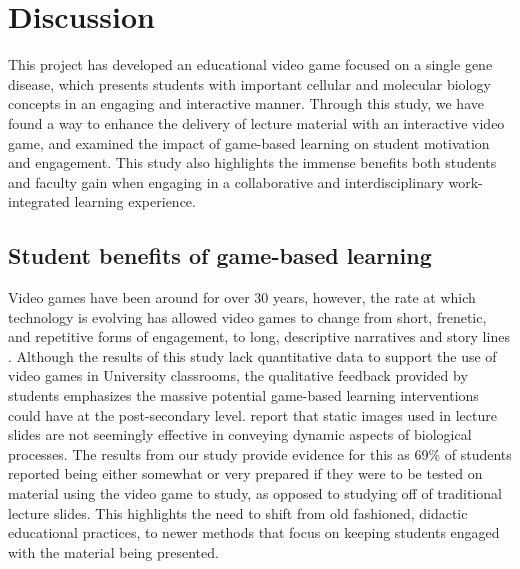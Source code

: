 \documentclass[10pt]{article}
\begin{document}
\newpage

\section{Discussion}

This project has developed an educational video game focused on a single gene disease, which presents students with important cellular and molecular biology concepts in an engaging and interactive manner. Through this study, we have found a way to enhance the delivery of lecture material with an interactive video game, and examined the impact of game-based learning on student motivation and engagement. This study also highlights the immense benefits both students and faculty gain when engaging in a collaborative and interdisciplinary work-integrated learning experience. 

\subsection{Student benefits of game-based learning}

Video games have been around for over 30 years, however, the rate at which technology is evolving has allowed video games to change from short, frenetic, and repetitive forms of engagement, to long, descriptive narratives and story lines \citep{annetta2008video}. Although the results of this study lack quantitative data to support the use of video games in University classrooms, the qualitative feedback provided by students emphasizes the massive potential game-based learning interventions could have at the post-secondary level. \citet{o2009garage} report that static images used in lecture slides are not seemingly effective in conveying dynamic aspects of biological processes. The results from our study provide evidence for this as 69\% of students reported being either somewhat or very prepared if they were to be tested on material using the video game to study, as opposed to studying off of traditional lecture slides. This highlights the need to shift from old fashioned, didactic educational practices, to newer methods that focus on keeping students engaged with the material being presented. 
\end{document}
